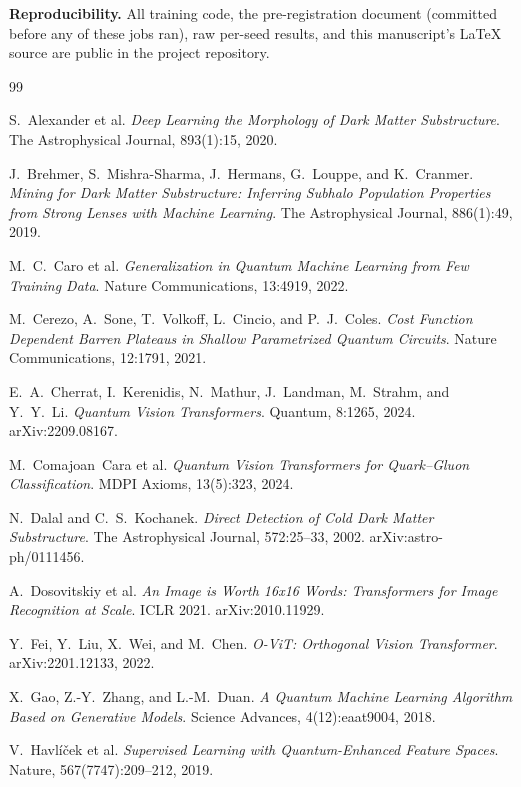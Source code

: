 \documentclass[10pt,letterpaper]{article}
\theoremstyle{plain}
\theoremstyle{definition}
\begin{document}
\textbf{Reproducibility.} All training code, the pre-registration document
(committed before any of these jobs ran), raw per-seed results, and this
manuscript's \LaTeX{} source are public in the project repository.

\small
\begin{thebibliography}{99}

S.~Alexander et al.
\textit{Deep Learning the Morphology of Dark Matter Substructure}.
The Astrophysical Journal, 893(1):15, 2020.

J.~Brehmer, S.~Mishra-Sharma, J.~Hermans, G.~Louppe, and K.~Cranmer.
\textit{Mining for Dark Matter Substructure: Inferring Subhalo Population
Properties from Strong Lenses with Machine Learning}.
The Astrophysical Journal, 886(1):49, 2019.

M.~C.~Caro et al.
\textit{Generalization in Quantum Machine Learning from Few Training Data}.
Nature Communications, 13:4919, 2022.

M.~Cerezo, A.~Sone, T.~Volkoff, L.~Cincio, and P.~J.~Coles.
\textit{Cost Function Dependent Barren Plateaus in Shallow Parametrized
Quantum Circuits}.
Nature Communications, 12:1791, 2021.

E.~A.~Cherrat, I.~Kerenidis, N.~Mathur, J.~Landman, M.~Strahm,
and Y.~Y.~Li.
\textit{Quantum Vision Transformers}.
Quantum, 8:1265, 2024. arXiv:2209.08167.

M.~Comajoan~Cara et al.
\textit{Quantum Vision Transformers for Quark--Gluon Classification}.
MDPI Axioms, 13(5):323, 2024.

N.~Dalal and C.~S.~Kochanek.
\textit{Direct Detection of Cold Dark Matter Substructure}.
The Astrophysical Journal, 572:25--33, 2002. arXiv:astro-ph/0111456.

A.~Dosovitskiy et al.
\textit{An Image is Worth 16x16 Words: Transformers for Image Recognition
at Scale}.
ICLR 2021. arXiv:2010.11929.

Y.~Fei, Y.~Liu, X.~Wei, and M.~Chen.
\textit{O-ViT: Orthogonal Vision Transformer}.
arXiv:2201.12133, 2022.

X.~Gao, Z.-Y.~Zhang, and L.-M.~Duan.
\textit{A Quantum Machine Learning Algorithm Based on Generative Models}.
Science Advances, 4(12):eaat9004, 2018.

V.~Havl\'{i}\v{c}ek et al.
\textit{Supervised Learning with Quantum-Enhanced Feature Spaces}.
Nature, 567(7747):209--212, 2019.


\end{thebibliography}
\end{document}
